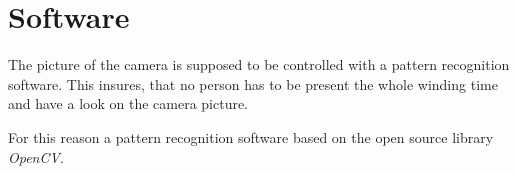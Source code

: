 \section{Software}
\label{sec:Software}

The picture of the camera is supposed to be controlled with a pattern recognition software. This insures, that no person has to be present the whole winding time and have a look on the camera picture. 

For this reason a pattern recognition software based on the open source library \emph{OpenCV}. 